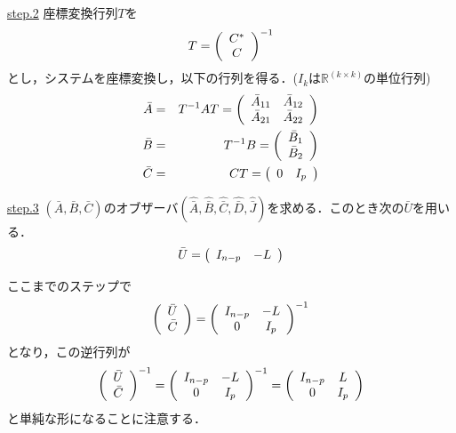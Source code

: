 \noindent \underline{step.2}
座標変換行列$T$を
\begin{equation}
        T =
	\bmatrix{c}
		C^* \\ 
		C 
	\ematrix ^{-1}
\end{equation}
とし，システムを座標変換し，以下の行列を得る．($I_k$は${\mathbb R}^{(k \times k)}$の単位行列)
\begin{eqnarray}
   \bar{A} & = & T^{-1} A T = \bmatrix{cc}
				\bar{A}_{11} & \bar{A}_{12} \\
				\bar{A}_{21} & \bar{A}_{22} \\
			      \ematrix
\\
   \bar{B} & = & T^{-1} B = \bmatrix {c}
				\bar{B}_1 \\
				\bar{B}_2 
			    \ematrix
\\
   \bar{C} & = & C T = \bmatrix{cc}
				0 & I_{p} \\
			\ematrix
\end{eqnarray}

\noindent \underline{step.3}
$(\bar{A}, \bar{B}, \bar{C})$のオブザーバ$(\hat{\bar{A}}, \hat{\bar{B}}, \hat{\bar{C}}, \hat{\bar{D}}, \hat{\bar{J}})$を求める．このとき次の$\bar{U}$を用いる．
\begin{equation}
   \bar{U} = \bmatrix{cc}
		I_{n-p} & -L
	     \ematrix
\end{equation}

ここまでのステップで
\begin{align}
	\bmatrix{c}
		\bar{U} \\
		\bar{C}
	\ematrix
	=
	\bmatrix{cc}
		I_{n-p} & -L \\
		0 &  I_{p} 
	\ematrix ^{-1}
\end{align}
となり，この逆行列が
\begin{align}
	\bmatrix{c}
		\bar{U} \\
		\bar{C}
	\ematrix^{-1}
	=
	\bmatrix{cc}
		I_{n-p} & -L \\
		0 &  I_{p} 
	\ematrix ^{-1}
	=
	\bmatrix{cc}
		I_{n-p} & L \\
		0 &  I_{p} 
	\ematrix
\end{align}
と単純な形になることに注意する．\\

